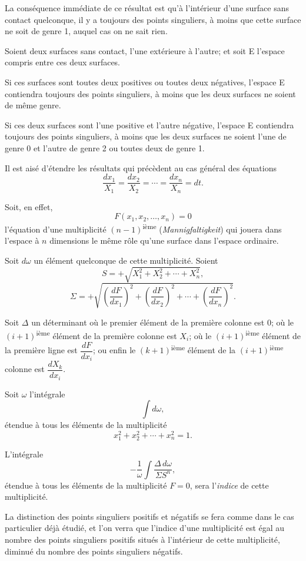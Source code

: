\documentclass[11pt]{article}
\begin{document}
La conséquence immédiate de ce résultat est qu’à l’intérieur d’une surface sans contact quelconque, il y a toujours des points singuliers, à moins que cette surface ne soit de genre 1, auquel cas on ne sait rien.

Soient deux surfaces sans contact, l’une extérieure à l’autre; et soit E l’espace compris entre ces deux surfaces.

Si ces surfaces sont toutes deux positives ou toutes deux négatives, l’espace E contiendra toujours des points singuliers, à moins que les deux surfaces ne soient de même genre.

Si ces deux surfaces sont l’une positive et l’autre négative, l’espace E contiendra toujours des points singuliers, à moins que les deux surfaces ne soient l’une de genre 0 et l’autre de genre 2 ou toutes deux de genre 1.

Il est aisé d’étendre les résultats qui précèdent au cas général des équations
\[
\frac{dx_1}{X_1}=\frac{dx_2}{X_2}=\cdots=\frac{dx_n}{X_n}=dt.
\]

Soit, en effet,
\[
F(x_1,x_2,\ldots,x_n)=0
\]
l’équation d’une multiplicité $(n-1)$\textsuperscript{ième} (\emph{Mannigfaltigkeit}) qui jouera dans l’espace à $n$ dimensions le même rôle qu’une surface dans l’espace ordinaire.

Soit $d\omega$ un élément quelconque de cette multiplicité. Soient
\[
S=+\sqrt{X_1^2+X_2^2+\cdots+X_n^2},
\]
\[
\Sigma=+\sqrt{\left(\frac{dF}{dx_1}\right)^2+\left(\frac{dF}{dx_2}\right)^2+\cdots+\left(\frac{dF}{dx_n}\right)^2}.
\]

Soit $\Delta$ un déterminant où le premier élément de la première colonne est 0; où le $(i+1)$\textsuperscript{ième} élément de la première colonne est $X_i$; où le $(i+1)$\textsuperscript{ième} élément de la première ligne est $\dfrac{dF}{dx_i}$; ou enfin le $(k+1)$\textsuperscript{ième} élément de la $(i+1)$\textsuperscript{ième} colonne est $\dfrac{dX_k}{dx_i}$.

Soit $\omega$ l’intégrale
\[
\int d\omega,
\]
étendue à tous les éléments de la multiplicité
\[
x_1^2+x_2^2+\cdots+x_n^2=1.
\]

L’intégrale
\[
-\frac1{\omega}\int\frac{\Delta\,d\omega}{\Sigma S^n},
\]
étendue à tous les éléments de la multiplicité $F=0$, sera l’\emph{indice} de cette multiplicité.

La distinction des points singuliers positifs et négatifs se fera comme dans le cas particulier déjà étudié, et l’on verra que l’indice d’une multiplicité est égal au nombre des points singuliers positifs situés à l’intérieur de cette multiplicité, diminué du nombre des points singuliers négatifs.
\end{document}
